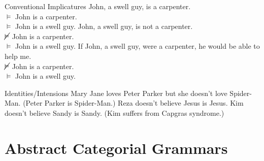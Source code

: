 \documentclass{beamer}
\begin{document}
\begin{frame}{Conventional Implicatures}
John, a swell guy, is a carpenter. \\
$\vDash$ John is a carpenter. \\
$\vDash$ John is a swell guy.
\vfill
\pause
John, a swell guy, is not a carpenter. \\
$\cancel{\vDash}$ John is a carpenter. \\
$\vDash$ John is a swell guy.
\vfill
\pause
If John, a swell guy, were a carpenter, he would be able to help me. \\
$\cancel{\vDash}$ John is a carpenter. \\
$\vDash$ John is a swell guy.
\end{frame}


\begin{frame}{Identities/Intensions}
Mary Jane loves Peter Parker but she doesn't love Spider-Man. (Peter Parker
is Spider-Man.)
\vfill
\pause
Reza doesn't believe Jesus is Jesus.
\vfill
\pause
Kim doesn't believe Sandy is Sandy. (Kim suffers from Capgras syndrome.)
\end{frame}



\section{Abstract Categorial Grammars}
\end{document}

